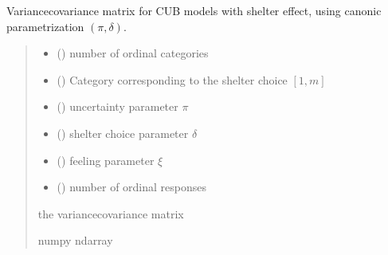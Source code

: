 \documentclass[letterpaper,10pt,english]{sphinxmanual}
\begin{document}

\begin{fulllineitems}
\label{\detokenize{cubmods:cubmods.cubsh.varcov_pxd}}
\pysigstartsignatures
{}
\pysigstopsignatures
\sphinxAtStartPar
Variance\sphinxhyphen{}covariance matrix for CUB models with shelter effect,
using canonic parametrization \((\pi, \delta)\).
\begin{quote}\begin{description}
\begin{itemize}
\item {} 
\sphinxAtStartPar
{} () \textendash{} number of ordinal categories

\item {} 
\sphinxAtStartPar
{} () \textendash{} Category corresponding to the shelter choice \([1,m]\)

\item {} 
\sphinxAtStartPar
{} () \textendash{} uncertainty parameter \(\pi\)

\item {} 
\sphinxAtStartPar
{} () \textendash{} shelter choice parameter \(\delta\)

\item {} 
\sphinxAtStartPar
{} () \textendash{} feeling parameter \(\xi\)

\item {} 
\sphinxAtStartPar
{} () \textendash{} number of ordinal responses

\end{itemize}

\sphinxAtStartPar
the variance\sphinxhyphen{}covariance matrix

\sphinxAtStartPar
numpy ndarray

\end{description}\end{quote}

\end{fulllineitems}
\end{document}
